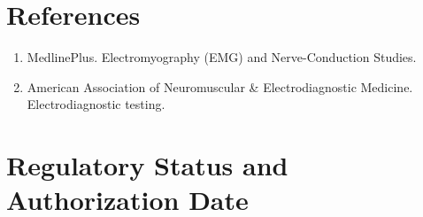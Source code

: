 \section*{References}
\begin{enumerate}
  \item MedlinePlus. Electromyography (EMG) and Nerve-Conduction Studies.
  \item American Association of Neuromuscular \& Electrodiagnostic Medicine. Electrodiagnostic testing.
\end{enumerate}

\clearpage


\section*{Regulatory Status and Authorization Date}

\clearpage
